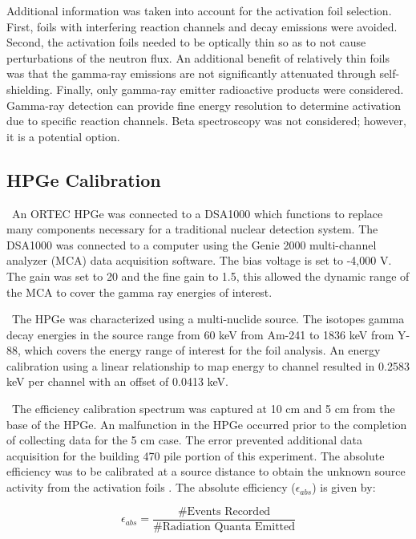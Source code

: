 \documentclass[journal]{IEEEtran}
\begin{document}
	Additional information was taken into account for the activation foil selection. First, foils with interfering reaction channels and decay emissions were avoided. Second, the activation foils needed to be optically thin so as to not cause perturbations of the neutron flux. An additional benefit of relatively thin foils was that the gamma-ray emissions are not significantly attenuated through self-shielding. Finally, only gamma-ray emitter radioactive products were considered. Gamma-ray detection can provide fine energy resolution to determine activation due to specific reaction channels. Beta spectroscopy was not considered; however, it is a potential option. 
	
\subsection{HPGe Calibration}

\ An ORTEC HPGe was connected to a DSA1000 which functions to replace many components necessary for a traditional nuclear detection system. The DSA1000 was connected to a computer using the Genie 2000 multi-channel analyzer (MCA) data acquisition software. The bias voltage is set to -4,000 V. The gain was set to 20 and the fine gain to 1.5, this allowed the dynamic range of the MCA to cover the gamma ray energies of interest. 


\ The HPGe was characterized using a multi-nuclide source. The isotopes gamma decay energies in the source range from 60 keV from Am-241 to 1836 keV from Y-88, which covers the energy range of interest for the foil analysis. An energy calibration using a linear relationship to map energy to channel resulted in 0.2583 keV per channel with an offset of 0.0413 keV. 

\ The efficiency calibration spectrum was captured at 10 cm and 5 cm from the base of the HPGe. An malfunction in the HPGe occurred prior to the completion of collecting data for the 5 cm case. The error prevented additional data acquisition for the building 470 pile portion of this experiment. The absolute efficiency was to be calibrated at a source distance to obtain the unknown source activity from the activation foils \cite{Knoll}. The absolute efficiency ($\epsilon_{abs}$) is given by:

\begin{equation} \label{eq:effa}
\epsilon_{abs} =\frac{\text{\# Events Recorded}}{\text{\# Radiation Quanta Emitted}}
\end{equation}
\end{document}
